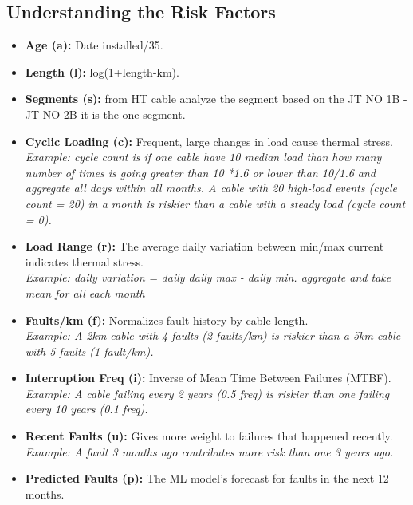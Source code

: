 \documentclass[a4paper,11pt]{article}
\begin{document}
\subsection{Understanding the Risk Factors}
\begin{itemize}
    \item \textbf{Age (a):} Date installed/35.
    \item \textbf{Length (l):} log(1+length-km). 
    \item \textbf{Segments (s):} from HT cable analyze the segment based on the JT NO 1B - JT NO 2B it is the one segment.
    \item \textbf{Cyclic Loading (c):} Frequent, large changes in load cause thermal stress. \\
    \textit{\small Example: cycle count is if one cable have 10 median load than how many number of times is going greater than 10 *1.6 or lower than 10/1.6 and aggregate all days within all months.  A cable with 20 high-load events (cycle count = 20) in a month is riskier than a cable with a steady load (cycle count = 0).}
    \item \textbf{Load Range (r):} The average daily variation between min/max current indicates thermal stress. \\
    \textit{\small Example: daily variation = daily daily max - daily min. aggregate and take mean for all each month}
    
    \item \textbf{Faults/km (f):} Normalizes fault history by cable length. \\
    \textit{\small Example: A 2km cable with 4 faults (2 faults/km) is riskier than a 5km cable with 5 faults (1 fault/km).}
    \item \textbf{Interruption Freq (i):} Inverse of Mean Time Between Failures (MTBF). \\
    \textit{\small Example: A cable failing every 2 years (0.5 freq) is riskier than one failing every 10 years (0.1 freq).}
    \item \textbf{Recent Faults (u):} Gives more weight to failures that happened recently. \\
    \textit{\small Example: A fault 3 months ago contributes more risk than one 3 years ago.}
    \item \textbf{Predicted Faults (p):} The ML model's forecast for faults in the next 12 months.
\end{itemize}
\newpage
\end{document}
